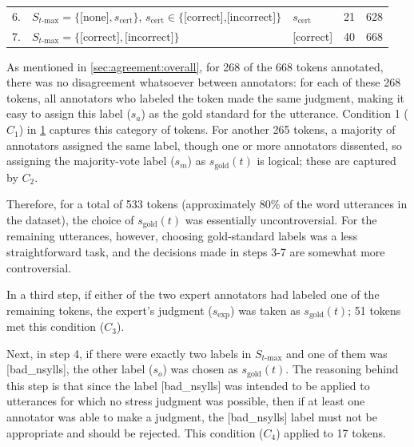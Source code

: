 \begin{table}[tb]
\begin{tabularx}{\textwidth}{rXlrr}
			6.& 
			$S_{t\text{-max}} = \{\text{[none]}, s_{\text{cert}}\}$, %
			\newline
			$s_{\text{cert}} \in \{$[correct],[incorrect]$\}$ 
			&
			$s_{\text{cert}}$ & 21 & 628\\
			
			7.& 
			$S_{t\text{-max}} = \{\text{[correct]},\text{[incorrect]}\}$
			&
			\mbox{[correct]} & 40 & 668\\
	
			\bottomrule
			\end{tabularx}
			
		\label{tab:agreement:goldrules}
		\end{table}
		
				
		
		
		
		As mentioned in \cref{sec:agreement:overall}, for 268 of the 
		668 tokens annotated, there was no disagreement whatsoever between annotators: for each of these 268 tokens, all annotators who labeled the token made the same judgment, making it easy to assign this label ($s_a$) as the gold standard for the utterance. Condition 1 ($C_1$) in \cref{tab:agreement:goldrules} captures this category of tokens. 
		For another 265 tokens, a majority of annotators assigned the same label, though one or more annotators dissented, so assigning the majority-vote label ($s_m$) as $s_{\text{gold}}(t)$ is logical; these are captured by $C_2$. 
		
		Therefore, for a total of 533 tokens (approximately 80\% of the word utterances in the dataset), the choice of $s_{\text{gold}}(t)$ was essentially uncontroversial.
		For the remaining 
		utterances, however, choosing gold-standard labels was a less straightforward task,
		and the decisions made in steps 3-7 are somewhat more controversial.
		
		In a third step, if either of the two expert annotators had labeled one of the remaining tokens, the expert's judgment ($s_{\text{exp}}$) was taken as $s_{\text{gold}}(t)$; 51 tokens met this condition ($C_3$). 
		
		Next, in step 4, if there were exactly two labels in $S_{t\text{-max}}$ and one of them was [bad\_nsylls], the other label ($s_o$) was chosen as $s_{\text{gold}}(t)$. The reasoning behind this step is that since the label [bad\_nsylls] was intended to be applied to utterances for which no stress judgment was possible, then if at least one annotator was able to make a judgment, the [bad\_nsylls] label must not be appropriate and should be rejected. This condition ($C_4$) applied to 17 tokens. 
		
